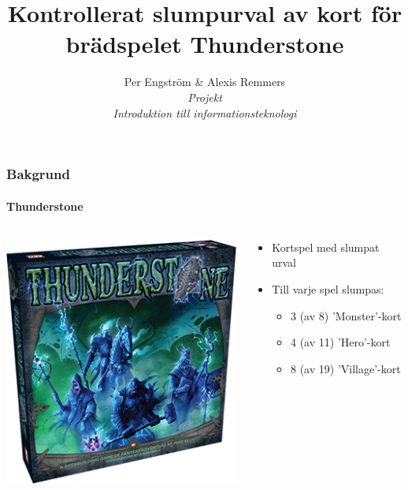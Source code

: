 \documentclass{beamer}
\title[Thundersone urval]{Kontrollerat slumpurval av kort för brädspelet Thunderstone}
\author[P. Engström, A. Remmers]{Per Engström \& Alexis Remmers \\[0.5cm] 
\normalsize \emph{Projekt} \\
\normalsize \emph{Introduktion till informationsteknologi}}
\begin{document}
\begin{frame}[plain]
	\centering
	\titlepage
\end{frame}

\begin{frame}
\frametitle{Bakgrund}
\framesubtitle{Thunderstone}

\begin{columns}%
    \begin{column}{.5\textwidth}
        \centering
        \includegraphics[width=\textwidth]{thunderstone-3dbox.png}
    \end{column}
    \begin{column}{.5\textwidth}
        \begin{itemize}
            \item Kortspel med slumpat urval
            \pause
            \item Till varje spel slumpas:
            \begin{itemize}
                \item 3 (av 8) 'Monster'-kort
                \item 4 (av 11) 'Hero'-kort
                \item 8 (av 19) 'Village'-kort
            \end{itemize}
        \end{itemize}
    \end{column}
\end{columns}

\end{frame}
\end{document}
